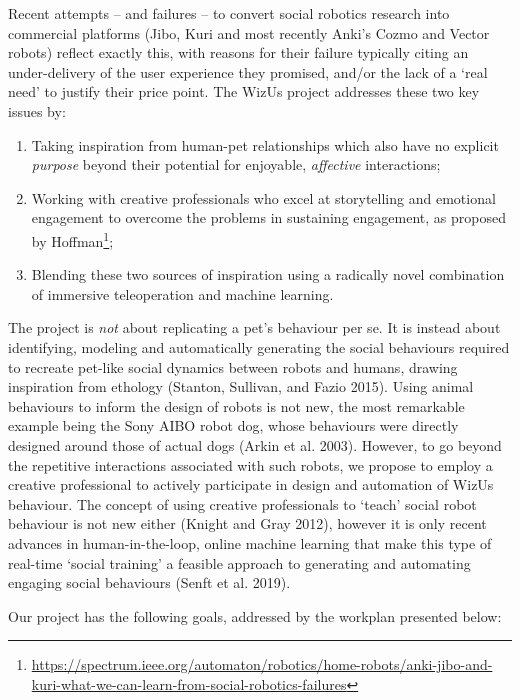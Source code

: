 \documentclass[11pt]{report}
\newcommand{\project}{WizUs\xspace}
\begin{document}
Recent attempts -- and failures -- to convert social robotics research
into commercial platforms (Jibo, Kuri and most recently Anki's Cozmo and
Vector robots) reflect exactly this, with reasons for their failure
typically citing an under-delivery of the user experience they promised,
and/or the lack of a `real need' to justify their price point. The
\project project addresses these two key issues by:

\begin{enumerate}
\def\labelenumi{\arabic{enumi}.}
\item
  Taking inspiration from human-pet relationships which also have no
  explicit \emph{purpose} beyond their potential for enjoyable,
  \emph{affective} interactions;
\item
  Working with creative professionals who excel at storytelling and
  emotional engagement to overcome the problems in sustaining
  engagement, as proposed by Hoffman\footnote{\url{https://spectrum.ieee.org/automaton/robotics/home-robots/anki-jibo-and-kuri-what-we-can-learn-from-social-robotics-failures}};
\item
  Blending these two sources of inspiration using a radically novel
  combination of immersive teleoperation and machine learning.
\end{enumerate}

The project is \emph{not} about replicating a pet's behaviour per se. It
is instead about identifying, modeling and automatically generating the
social behaviours required to recreate pet-like social dynamics between
robots and humans, drawing inspiration from ethology (Stanton, Sullivan,
and Fazio 2015). Using animal behaviours to inform the design of robots
is not new, the most remarkable example being the Sony AIBO robot dog,
whose behaviours were directly designed around those of actual dogs
(Arkin et al. 2003). However, to go beyond the repetitive interactions
associated with such robots, we propose to employ a creative
professional to actively participate in design and automation of \project
behaviour. The concept of using creative professionals to `teach' social
robot behaviour is not new either (Knight and Gray 2012), however it is
only recent advances in human-in-the-loop, online machine learning that
make this type of real-time `social training' a feasible approach to
generating and automating engaging social behaviours (Senft et al.
2019).

Our project has the following goals, addressed by the workplan presented
below:
\end{document}
